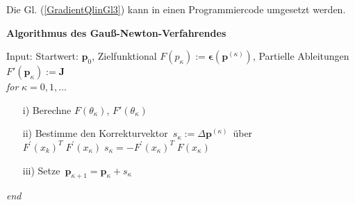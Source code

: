 Die Gl. (\ref{GradientQlinGl3}) kann in einen Programmiercode
umgesetzt werden. 

\textbf{Algorithmus des Gauß-Newton-Verfahrendes}

Input: Startwert: $\boldsymbol p_0$, Zielfunktional $F(p_\kappa):= \boldsymbol\epsilon (\boldsymbol p^{(\kappa)}) $, Partielle Ableitungen $F'(\boldsymbol p_{\kappa}) := \mathbf J$ \\
\hspace*{1em}\textit{for} $\kappa = 0,1, \ldots$ \\[-3ex]
\begin{itemize}
	\item[i)] Berechne $F(\theta_\kappa)$, $F'(\theta_\kappa)$ 
	\item[ii)] Bestimme den Korrekturvektor~$s_\kappa := \Delta \boldsymbol p^{(\kappa)}$~über~
	$F^\prime(x_k)^T\;F^\prime(x_\kappa)\; s_\kappa = -F^\prime(x_\kappa)^T\;F(x_\kappa)$
	\item[iii)] Setze~$\boldsymbol p_{\kappa+1} = \boldsymbol p_\kappa + s_\kappa$
\end{itemize}
\hspace*{1em}\textit{end} \\

